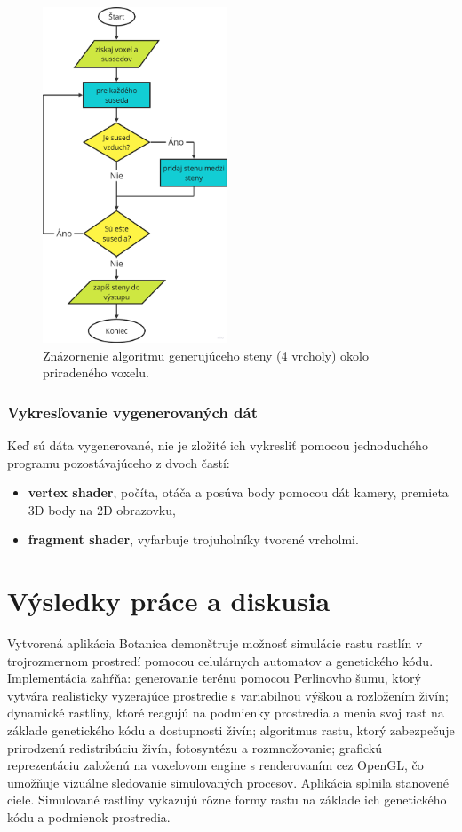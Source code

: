 \documentclass[12pt]{article}
\begin{document}
\begin{figure}[ht]
	\centering
	\includegraphics[height=10cm]{res/diagram_generovanie_voxelov.png}
	\caption{Znázornenie algoritmu generujúceho steny (4 vrcholy) okolo priradeného voxelu.}
	\label{obr:diagram algoritmu generujuceho vertexy}
\end{figure}

\newpage
\subsubsection{Vykresľovanie vygenerovaných dát}

Keď sú dáta vygenerované, nie je zložité ich vykresliť pomocou jednoduchého
programu pozostávajúceho z dvoch častí:

\begin{itemize}
	\item \textbf{vertex shader}, počíta, otáča a posúva body pomocou dát kamery,
	      premieta 3D body na 2D obrazovku,
	\item \textbf{fragment shader}, vyfarbuje trojuholníky tvorené vrcholmi.
\end{itemize}


\section{Výsledky práce a diskusia}

Vytvorená aplikácia Botanica demonštruje možnosť simulácie rastu rastlín
v trojrozmernom prostredí pomocou celulárnych automatov a genetického kódu.
Implementácia zahŕňa: generovanie terénu pomocou Perlinovho šumu, ktorý vytvára
realisticky vyzerajúce prostredie s variabilnou výškou a rozložením živín;
dynamické rastliny, ktoré reagujú na podmienky prostredia a menia svoj rast
na základe genetického kódu a dostupnosti živín; algoritmus rastu, ktorý
zabezpečuje prirodzenú redistribúciu živín, fotosyntézu a rozmnožovanie;
grafickú reprezentáciu založenú na voxelovom engine s renderovaním cez OpenGL,
čo umožňuje vizuálne sledovanie simulovaných procesov. Aplikácia splnila
stanovené ciele. Simulované rastliny vykazujú rôzne formy rastu na základe
ich genetického kódu a podmienok prostredia.
\end{document}
